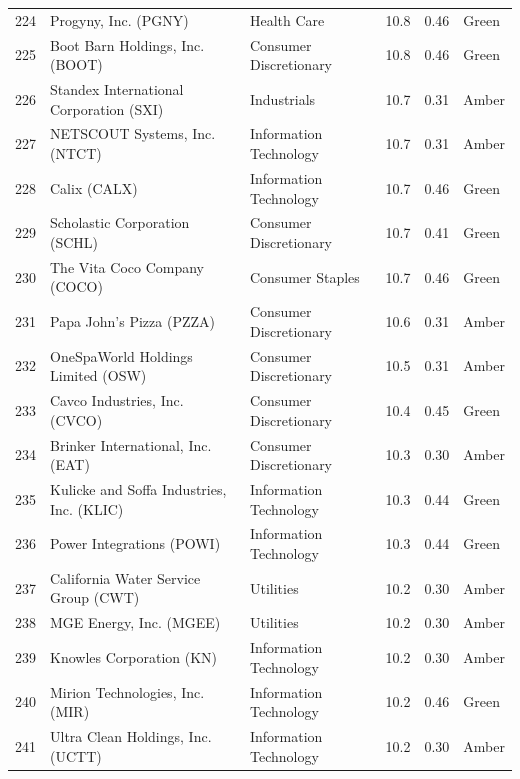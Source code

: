 \documentclass[11pt,a4paper]{article}
\begin{document}
{\begin{longtable}{r p{4.6cm} p{3cm} r r l}
224 & Progyny, Inc. (PGNY) & Health Care & 10.8 & 0.46 & \cellcolor[HTML]{C6EFCE}Green \\
225 & Boot Barn Holdings, Inc. (BOOT) & Consumer Discretionary & 10.8 & 0.46 & \cellcolor[HTML]{C6EFCE}Green \\
226 & Standex International Corporation (SXI) & Industrials & 10.7 & 0.31 & \cellcolor[HTML]{FFEB9C}Amber \\
227 & NETSCOUT Systems, Inc. (NTCT) & Information Technology & 10.7 & 0.31 & \cellcolor[HTML]{FFEB9C}Amber \\
228 & Calix (CALX) & Information Technology & 10.7 & 0.46 & \cellcolor[HTML]{C6EFCE}Green \\
229 & Scholastic Corporation (SCHL) & Consumer Discretionary & 10.7 & 0.41 & \cellcolor[HTML]{C6EFCE}Green \\
230 & The Vita Coco Company (COCO) & Consumer Staples & 10.7 & 0.46 & \cellcolor[HTML]{C6EFCE}Green \\
231 & Papa John's Pizza (PZZA) & Consumer Discretionary & 10.6 & 0.31 & \cellcolor[HTML]{FFEB9C}Amber \\
232 & OneSpaWorld Holdings Limited (OSW) & Consumer Discretionary & 10.5 & 0.31 & \cellcolor[HTML]{FFEB9C}Amber \\
233 & Cavco Industries, Inc. (CVCO) & Consumer Discretionary & 10.4 & 0.45 & \cellcolor[HTML]{C6EFCE}Green \\
234 & Brinker International, Inc. (EAT) & Consumer Discretionary & 10.3 & 0.30 & \cellcolor[HTML]{FFEB9C}Amber \\
235 & Kulicke and Soffa Industries, Inc. (KLIC) & Information Technology & 10.3 & 0.44 & \cellcolor[HTML]{C6EFCE}Green \\
236 & Power Integrations (POWI) & Information Technology & 10.3 & 0.44 & \cellcolor[HTML]{C6EFCE}Green \\
237 & California Water Service Group (CWT) & Utilities & 10.2 & 0.30 & \cellcolor[HTML]{FFEB9C}Amber \\
238 & MGE Energy, Inc. (MGEE) & Utilities & 10.2 & 0.30 & \cellcolor[HTML]{FFEB9C}Amber \\
239 & Knowles Corporation (KN) & Information Technology & 10.2 & 0.30 & \cellcolor[HTML]{FFEB9C}Amber \\
240 & Mirion Technologies, Inc. (MIR) & Information Technology & 10.2 & 0.46 & \cellcolor[HTML]{C6EFCE}Green \\
241 & Ultra Clean Holdings, Inc. (UCTT) & Information Technology & 10.2 & 0.30 & \cellcolor[HTML]{FFEB9C}Amber \\

\end{longtable}}
\end{document}
